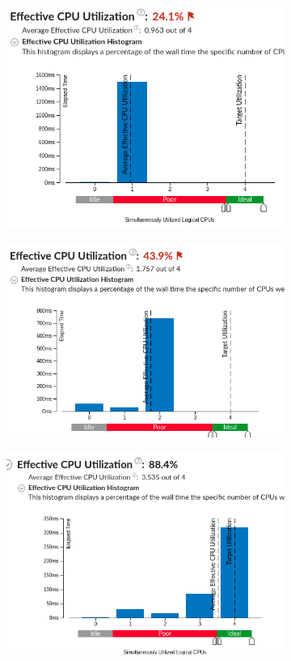 \documentclass[12pt]{article}
\begin{document}
\begin{figure}[h!]
	\begin{subfigure}[b]{0.32\linewidth}
		\includegraphics[width=\linewidth]{PR/08_01.png}
	\end{subfigure}
	\begin{subfigure}[b]{0.32\linewidth}
		\includegraphics[width=\linewidth]{PR/08_02.png}
	\end{subfigure}
	\begin{subfigure}[b]{0.32\linewidth}
		\includegraphics[width=\linewidth]{PR/08_04.png}

\end{subfigure}
\end{figure}
\end{document}
